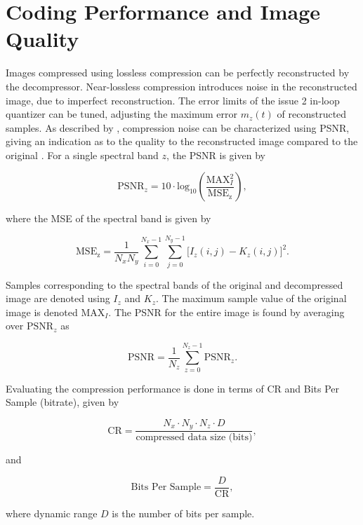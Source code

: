 \section{Coding Performance and Image Quality}
\label{sec:metrics}

Images compressed using lossless compression can be perfectly reconstructed by the decompressor. Near-lossless compression introduces noise in the reconstructed image, due to imperfect reconstruction. The error limits of the issue 2 in-loop quantizer can be tuned, adjusting the maximum error $m_z(t)$ of reconstructed samples. As described by \citeauthor{salomonDataCompressionComplete2004}, compression noise can be characterized using \acrfull{PSNR}, giving an indication as to the quality to the reconstructed image compared to the original \cite{salomonDataCompressionComplete2004}. For a single spectral band $z$, the \acrshort{PSNR} is given by

\begin{equation}
	\mathrm{PSNR}_z = 10 \cdot \text{log}_{10} \left( \frac{\mathrm{MAX}^2_I}{\mathrm{MSE_z}} \right),
	\label{eq:PSNRz}
\end{equation}

where the \acrfull{MSE} of the spectral band is given by

\begin{equation}
	\mathrm{MSE_z} = \frac{1}{N_x N_y}
	\sum_{i=0}^{N_x-1} \sum_{j=0}^{N_y-1} \bigl[I_z(i,j) - K_z(i,j)\bigr]^2.
	\label{eq:MSE}
\end{equation}

Samples corresponding to the spectral bands of the original and decompressed image are denoted using $I_z$ and $K_z$. The maximum sample value of the original image is denoted $\mathrm{MAX}_I$. The \acrshort{PSNR} for the entire image is found by averaging over $\mathrm{PSNR}_z$ as

\begin{equation}
	\mathrm{PSNR} = \frac{1}{N_z} \sum_{z=0}^{N_z-1} \mathrm{PSNR}_z.
	\label{eq:PSNR}
\end{equation}

Evaluating the compression performance is done in terms of \acrfull{CR} and Bits Per Sample (bitrate), given by

\begin{equation}
	\mathrm{CR} = \frac{N_x \cdot N_y \cdot N_z \cdot D}{\text{compressed data size (bits)}},
	\label{eq:cr}
\end{equation}

and

\begin{equation}
	\text{Bits Per Sample} = \frac{D}{\mathrm{CR}},
	\label{eq:bitrate}
\end{equation}

where dynamic range $D$ is the number of bits per sample.

